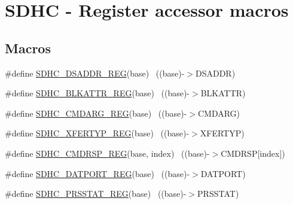 \hypertarget{group___s_d_h_c___register___accessor___macros}{}\section{S\+D\+HC -\/ Register accessor macros}
\label{group___s_d_h_c___register___accessor___macros}
\subsection*{Macros}
\begin{DoxyCompactItemize}
\item 
\#define \hyperlink{group___s_d_h_c___register___accessor___macros_gaff5fe2696bbe46c19405b9a26bade43b}{S\+D\+H\+C\+\_\+\+D\+S\+A\+D\+D\+R\+\_\+\+R\+EG}(base)                                    ~((base)-\/$>$D\+S\+A\+D\+DR)
\item 
\#define \hyperlink{group___s_d_h_c___register___accessor___macros_ga4e25f7d2c643d77255560ebe463e2e83}{S\+D\+H\+C\+\_\+\+B\+L\+K\+A\+T\+T\+R\+\_\+\+R\+EG}(base)                                  ~((base)-\/$>$B\+L\+K\+A\+T\+TR)
\item 
\#define \hyperlink{group___s_d_h_c___register___accessor___macros_gab64cab6a76d88f1503d93bc85a8c6b8e}{S\+D\+H\+C\+\_\+\+C\+M\+D\+A\+R\+G\+\_\+\+R\+EG}(base)                                    ~((base)-\/$>$C\+M\+D\+A\+RG)
\item 
\#define \hyperlink{group___s_d_h_c___register___accessor___macros_ga563a47325e0aa457d7b61679cfe69a53}{S\+D\+H\+C\+\_\+\+X\+F\+E\+R\+T\+Y\+P\+\_\+\+R\+EG}(base)                                  ~((base)-\/$>$X\+F\+E\+R\+T\+YP)
\item 
\#define \hyperlink{group___s_d_h_c___register___accessor___macros_ga286b1184e03e0b6c8fa5f4ff609b2d42}{S\+D\+H\+C\+\_\+\+C\+M\+D\+R\+S\+P\+\_\+\+R\+EG}(base,  index)                        ~((base)-\/$>$C\+M\+D\+R\+SP\mbox{[}index\mbox{]})
\item 
\#define \hyperlink{group___s_d_h_c___register___accessor___macros_ga89e52da8690fb9ad00aa570076cb2061}{S\+D\+H\+C\+\_\+\+D\+A\+T\+P\+O\+R\+T\+\_\+\+R\+EG}(base)                                  ~((base)-\/$>$D\+A\+T\+P\+O\+RT)
\item 
\#define \hyperlink{group___s_d_h_c___register___accessor___macros_ga916e0f0f8580bd37b945ac511d59fd0c}{S\+D\+H\+C\+\_\+\+P\+R\+S\+S\+T\+A\+T\+\_\+\+R\+EG}(base)                                  ~((base)-\/$>$P\+R\+S\+S\+T\+AT)
\item 

\end{DoxyCompactItemize}
